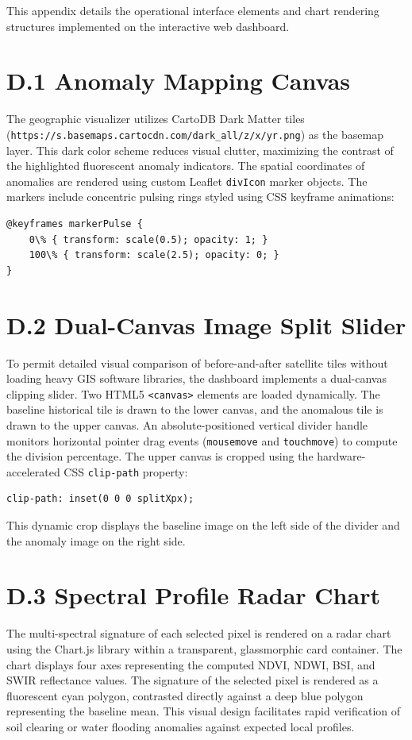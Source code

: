 
This appendix details the operational interface elements and chart rendering structures implemented on the interactive web dashboard.

\section{D.1 Anomaly Mapping Canvas}
The geographic visualizer utilizes CartoDB Dark Matter tiles (\texttt{https://{s}.basemaps.cartocdn.com/dark\_all/{z}/{x}/{y}{r}.png}) as the basemap layer. This dark color scheme reduces visual clutter, maximizing the contrast of the highlighted fluorescent anomaly indicators. The spatial coordinates of anomalies are rendered using custom Leaflet \texttt{divIcon} marker objects. The markers include concentric pulsing rings styled using CSS keyframe animations:
\begin{verbatim}
@keyframes markerPulse {
    0\% { transform: scale(0.5); opacity: 1; }
    100\% { transform: scale(2.5); opacity: 0; }
}
\end{verbatim}

\section{D.2 Dual-Canvas Image Split Slider}
To permit detailed visual comparison of before-and-after satellite tiles without loading heavy GIS software libraries, the dashboard implements a dual-canvas clipping slider. Two HTML5 \texttt{<canvas>} elements are loaded dynamically. The baseline historical tile is drawn to the lower canvas, and the anomalous tile is drawn to the upper canvas. An absolute-positioned vertical divider handle monitors horizontal pointer drag events (\texttt{mousemove} and \texttt{touchmove}) to compute the division percentage. The upper canvas is cropped using the hardware-accelerated CSS \texttt{clip-path} property:
\begin{verbatim}
clip-path: inset(0 0 0 splitXpx);
\end{verbatim}
This dynamic crop displays the baseline image on the left side of the divider and the anomaly image on the right side.

\section{D.3 Spectral Profile Radar Chart}
The multi-spectral signature of each selected pixel is rendered on a radar chart using the Chart.js library within a transparent, glassmorphic card container. The chart displays four axes representing the computed NDVI, NDWI, BSI, and SWIR reflectance values. The signature of the selected pixel is rendered as a fluorescent cyan polygon, contrasted directly against a deep blue polygon representing the baseline mean. This visual design facilitates rapid verification of soil clearing or water flooding anomalies against expected local profiles.
